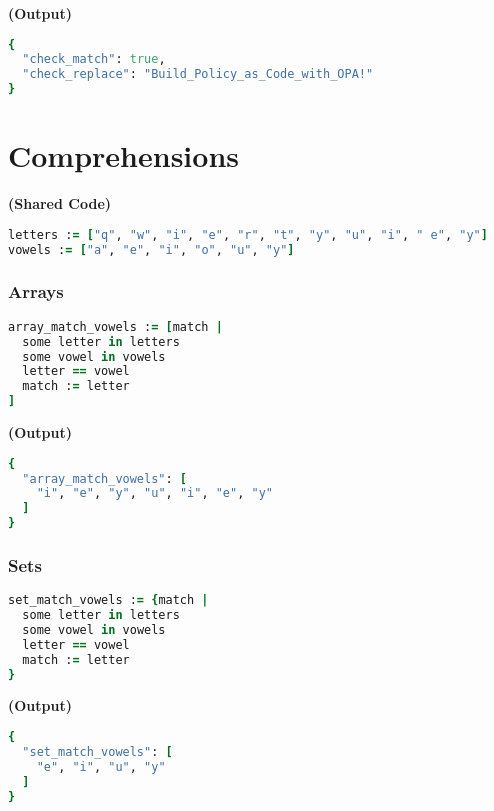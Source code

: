 \documentclass[twocolumn]{article}
\begin{document}
\textbf{\tiny{(Output)}}
\begin{lstlisting}[language=Ruby]
{
  "check_match": true,
  "check_replace": "Build_Policy_as_Code_with_OPA!"
}
\end{lstlisting}




\section*{Comprehensions}


\textbf{\tiny{(Shared Code)}}
\begin{lstlisting}[language=Ruby]
letters := ["q", "w", "i", "e", "r", "t", "y", "u", "i", " e", "y"]
vowels := ["a", "e", "i", "o", "u", "y"]
\end{lstlisting}



\vspace{-1em}
\subsubsection*{Arrays}

\begin{lstlisting}[language=Ruby]
array_match_vowels := [match |
  some letter in letters
  some vowel in vowels
  letter == vowel
  match := letter
]
\end{lstlisting}



\textbf{\tiny{(Output)}}
\begin{lstlisting}[language=Ruby]
{
  "array_match_vowels": [
    "i", "e", "y", "u", "i", "e", "y"
  ]
}

\end{lstlisting}



\vspace{-1em}
\subsubsection*{Sets}

\begin{lstlisting}[language=Ruby]
set_match_vowels := {match |
  some letter in letters
  some vowel in vowels
  letter == vowel
  match := letter
}
\end{lstlisting}



\textbf{\tiny{(Output)}}
\begin{lstlisting}[language=Ruby]
{
  "set_match_vowels": [
    "e", "i", "u", "y"
  ]
}

\end{lstlisting}
\end{document}

